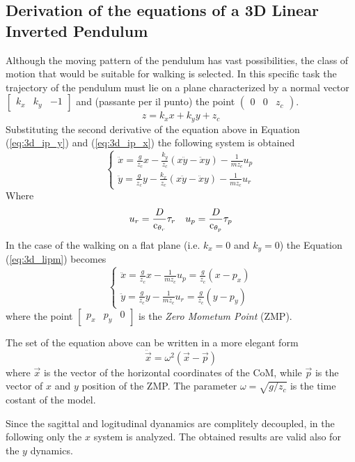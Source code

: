 \subsection{Derivation of the equations of a 3D Linear Inverted Pendulum}
Although the moving pattern of the pendulum has vast possibilities, the class of motion that
would be suitable for walking is selected. In this specific task the trajectory of the pendulum
must lie on a plane characterized by a normal vector
$\begin{bmatrix} k_x & k_y & -1 \end{bmatrix}$
and (passante per il punto) the point $(\begin{matrix} 0 & 0 & z_c \end{matrix})$.
\[
z = k_x x + k_y y + z_c
\]
Substituting the second derivative of the equation above in Equation (\ref{eq:3d_ip_y})
and (\ref{eq:3d_ip_x}) the following system is obtained
\begin{equation}
  \label{eq:3d_lipm}
  \begin{cases}
    \ddot{x} = \frac{g}{z_c}x - \frac{k_y}{z_c}(x \ddot{y} - \ddot{x} y) - \frac{1}{m z_c} u_p\\
    \ddot{y} = \frac{g}{z_c}y - \frac{k_x}{z_c}(x \ddot{y} - \ddot{x} y) - \frac{1}{m z_c} u_r
  \end{cases}
\end{equation}
Where
\[
u_r = \frac{D}{\mathop{}\!\mathrm{c}_{\theta_r}} \tau_r \quad u_p = \frac{D}{\mathop{}\!\mathrm{c}_{\theta_p}} \tau_p
\]
In the case of the walking on a flat plane (i.e. $k_x = 0$ and $k_y = 0$)
the Equation (\ref{eq:3d_lipm}) becomes
\[
\begin{cases}
  \ddot{x} = \frac{g}{z_c}x - \frac{1}{m z_c} u_p = \frac{g}{z_c} (x - p_x)\\
  \ddot{y} = \frac{g}{z_c}y - \frac{1}{m z_c} u_r = \frac{g}{z_c} (y - p_y)
\end{cases}
\]
where the point $\begin{bmatrix} p_x & p_y & 0 \end{bmatrix}$ is the \emph{Zero Mometum Point} (ZMP).
\par
The set of the equation above can be written in a more elegant form
\[
\ddot{\vec{x}} = \omega^2 (\vec{x} - \vec{p})
\]
where $\vec{x}$ is the vector of the horizontal coordinates of the CoM, while $\vec{p}$ is the vector of $x$ and $y$ position of the ZMP. The parameter $\omega = \sqrt{g/z_c}$ is the time costant of the model.
\par
Since the sagittal and logitudinal dyanamics are complitely decoupled, in the following only the $x$ system is analyzed. The obtained results are valid also for the $y$ dynamics.
